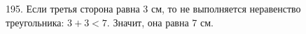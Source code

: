 195. Если третья сторона равна 3 см, то не выполняется неравенство треугольника: $3+3<7.$ Значит, она равна 7 см.\\
